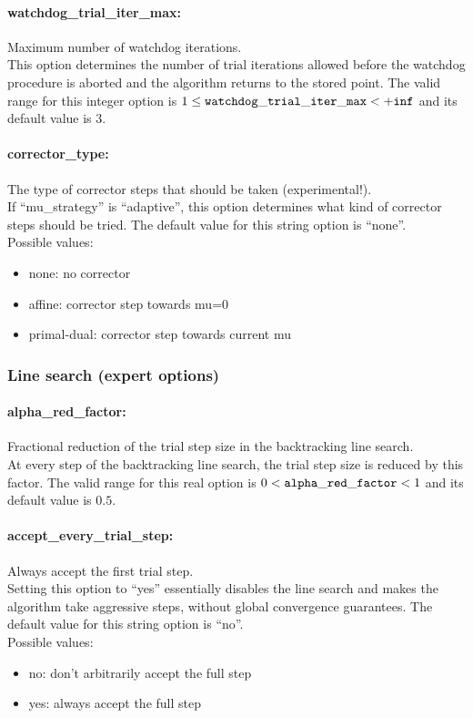 \paragraph{watchdog\_trial\_iter\_max:} Maximum number of watchdog iterations. $\;$ \\
 This option determines the number of trial
iterations allowed before the watchdog procedure
is aborted and the algorithm returns to the
stored point. The valid range for this integer option is
$1 \le {\tt watchdog\_trial\_iter\_max } <  {\tt +inf}$
and its default value is $3$.

\paragraph{corrector\_type:} The type of corrector steps that should be taken (experimental!). $\;$ \\
 If ``mu\_strategy'' is ``adaptive'', this option
determines what kind of corrector steps should be
tried.
The default value for this string option is ``none''.
\\ 
Possible values:
\begin{itemize}
   \item none: no corrector
   \item affine: corrector step towards mu=0
   \item primal-dual: corrector step towards current mu
\end{itemize}

\subsubsection{Line search (expert options)}

\paragraph{alpha\_red\_factor:} Fractional reduction of the trial step size in the backtracking line search. $\;$ \\
 At every step of the backtracking line search,
the trial step size is reduced by this factor. The valid range for this real option is 
$0 <  {\tt alpha\_red\_factor } <  1$
and its default value is $0.5$.


\paragraph{accept\_every\_trial\_step:} Always accept the first trial step. $\;$ \\
 Setting this option to ``yes'' essentially disables
the line search and makes the algorithm take
aggressive steps, without global convergence
guarantees.
The default value for this string option is ``no''.
\\ 
Possible values:
\begin{itemize}
   \item no: don't arbitrarily accept the full step
   \item yes: always accept the full step
\end{itemize}

